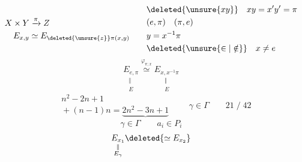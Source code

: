 \[
\begin{aligned}
 X\times Y&\xrightarrow{\pi} Z\\
 E_{x,y}&\simeq E_{\deleted{\unsure{z}}\pi(x,y)}
\end{aligned}
\qquad
\begin{aligned}
 &\deleted{\unsure{xy}}\quad xy=x'y'=\pi\\
 &(e,\pi)\quad(\pi,e)\\
 &y=x^{-1}\pi\\
 &\deleted{\unsure{\in|\notin}}\quad x\ne e
\end{aligned}
\]
\[
 \underset{\substack{\Vert\\E}}{E_{e,\pi}}
 \overset{\varphi_{\pi;x}}{\simeq}
 \underset{\substack{\Vert\\E}}{E_{x,x^{-1}\pi}}
\]
\[
 \begin{aligned}
 &n^2-2n+1\\
 &{}+(n-1)n=\underbrace{2n^2-3n+1}
 \end{aligned}
 \qquad \gamma\in \Gamma\qquad 21\;/\;42
\]
\[
 \gamma\in \Gamma\qquad a_i\in P_i
\]
\[
 \underset{\substack{\Vert\\E_\gamma}}{E_{x_1}}\deleted{\simeq E_{x_2}}
\]
